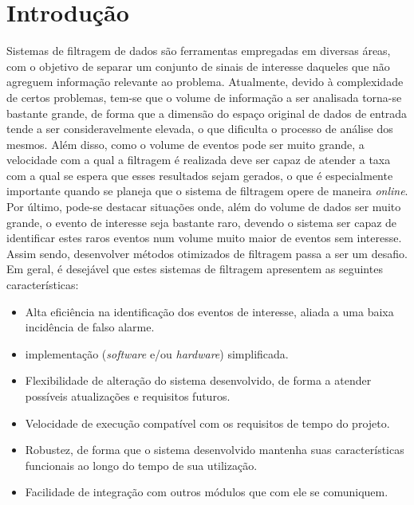 \chapter{Introdução}
\label{chap:introducao}

Sistemas de filtragem de dados são ferramentas empregadas em diversas áreas, com o objetivo de separar um conjunto de sinais de interesse daqueles que não agreguem informação relevante ao problema. Atualmente, devido à complexidade de certos problemas, tem-se que o volume de informação a ser analisada torna-se bastante grande, de forma que a dimensão do espaço original de dados de entrada tende a ser consideravelmente elevada, o que dificulta o processo de análise dos mesmos. Além disso, como o volume de eventos pode ser muito grande, a velocidade com a qual a filtragem é realizada deve ser capaz de atender a taxa com a qual se espera que esses resultados sejam gerados, o que é especialmente importante quando se planeja que o sistema de filtragem opere de maneira \emph{online}. Por último, pode-se destacar situações onde, além do volume de dados ser muito grande, o evento de interesse seja bastante raro, devendo o sistema ser capaz de identificar estes raros eventos num volume muito maior de eventos sem interesse. Assim sendo, desenvolver métodos otimizados de filtragem passa a ser um desafio. Em geral, é desejável que estes sistemas de filtragem apresentem as seguintes características:

\begin{itemize}

\item Alta eficiência na identificação dos eventos de interesse, aliada a uma baixa incidência de falso alarme.

\item implementação (\emph{software} e/ou \emph{hardware}) simplificada.

\item Flexibilidade de alteração do sistema desenvolvido, de forma a atender possíveis atualizações e requisitos futuros.

\item Velocidade de execução compatível com os requisitos de tempo do projeto.

\item Robustez, de forma que o sistema desenvolvido mantenha suas características funcionais ao longo do tempo de sua utilização.

\item Facilidade de integração com outros módulos que com ele se comuniquem.

\end{itemize}


